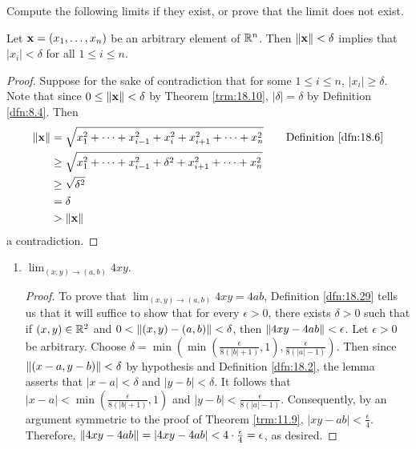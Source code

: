 \documentclass[../main.tex]{subfiles}
\begin{document}
\begin{exercise}\label{exr:18.30}
    Compute the following limits if they exist, or prove that the limit does not exist.
    \begin{lemma*}
        Let $\mathbf{x}=(x_1,\dots,x_n)$ be an arbitrary element of $\mathbb{R}^n$. Then $\norm{\mathbf{x}}<\delta$ implies that $|x_i|<\delta$ for all $1\leq i\leq n$.
        \begin{proof}
            Suppose for the sake of contradiction that for some $1\leq i\leq n$, $|x_i|\geq\delta$. Note that since $0\leq\norm{\mathbf{x}}<\delta$ by Theorem \ref{trm:18.10}, $|\delta|=\delta$ by Definition \ref{dfn:8.4}. Then
            \begin{align*}
                \norm{\x} &= \sqrt{x_1^2+\cdots+x_{i-1}^2+x_i^2+x_{i+1}^2+\cdots+x_n^2}\tag*{Definition \ref{dfn:18.6}}\\
                &\geq \sqrt{x_1^2+\cdots+x_{i-1}^2+\delta^2+x_{i+1}^2+\cdots+x_n^2}\\
                &\geq \sqrt{\delta^2}\\
                &= \delta\\
                &> \norm{\x}
            \end{align*}
            a contradiction.
        \end{proof}
    \end{lemma*}
    \begin{enumerate}[label={(\alph*)},ref={\theexercise\alph*}]
        \item \label{exr:18.30a}$\lim_{(x,y)\to(a,b)}4xy$.
        \begin{proof}
            To prove that $\lim_{(x,y)\to(a,b)}4xy=4ab$, Definition \ref{dfn:18.29} tells us that it will suffice to show that for every $\epsilon>0$, there exists $\delta>0$ such that if $(x,y)\in\mathbb{R}^2$ and $0<\norm{(x,y)-(a,b)}<\delta$, then $\norm{4xy-4ab}<\epsilon$. Let $\epsilon>0$ be arbitrary. Choose $\delta=\min(\min(\frac{\epsilon}{8(|b|+1)},1),\frac{\epsilon}{8(|a|-1)})$. Then since $\norm{(x-a,y-b)}<\delta$ by hypothesis and Definition \ref{dfn:18.2}, the lemma asserts that $|x-a|<\delta$ and $|y-b|<\delta$. It follows that $|x-a|<\min(\frac{\epsilon}{8(|b|+1)},1)$ and $|y-b|<\frac{\epsilon}{8(|a|-1)}$. Consequently, by an argument symmetric to the proof of Theorem \ref{trm:11.9}, $|xy-ab|<\frac{\epsilon}{4}$. Therefore, $\norm{4xy-4ab}=|4xy-4ab|<4\cdot\frac{\epsilon}{4}=\epsilon$, as desired.
        \end{proof}

\end{enumerate}
\end{exercise}
\end{document}
